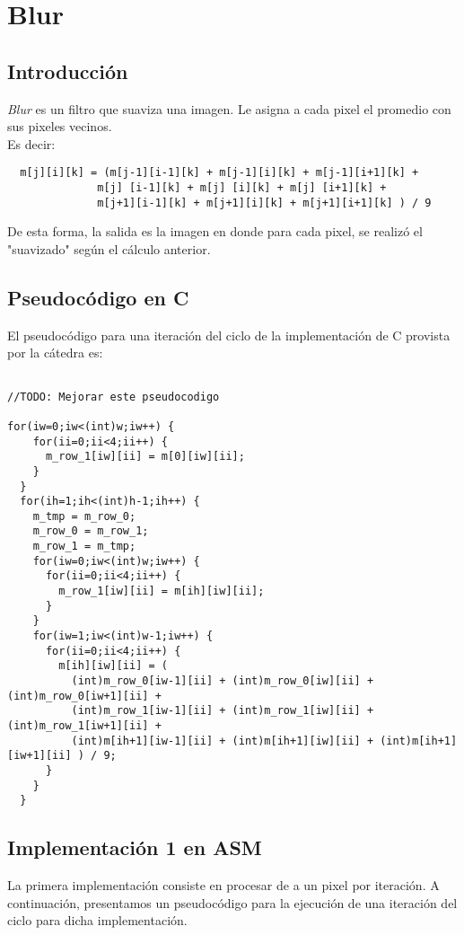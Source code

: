 \section{Blur}
\subsection{Introducción}
\textit{Blur} es un filtro que suaviza una imagen. Le asigna a cada pixel el promedio con sus pixeles vecinos.\\ Es decir:

\begin{verbatim}
  m[j][i][k] = (m[j-1][i-1][k] + m[j-1][i][k] + m[j-1][i+1][k] + 
              m[j] [i-1][k] + m[j] [i][k] + m[j] [i+1][k] + 
              m[j+1][i-1][k] + m[j+1][i][k] + m[j+1][i+1][k] ) / 9
\end{verbatim}

De esta forma, la salida es la imagen en donde para cada pixel, se realizó el "suavizado" según el cálculo anterior.

\subsection{Pseudocódigo en C}

El pseudocódigo para una iteración del ciclo de la implementación de C provista por la cátedra es:

\begin{lstlisting}

//TODO: Mejorar este pseudocodigo

for(iw=0;iw<(int)w;iw++) {
    for(ii=0;ii<4;ii++) {
      m_row_1[iw][ii] = m[0][iw][ii];
    }
  }
  for(ih=1;ih<(int)h-1;ih++) {
    m_tmp = m_row_0;
    m_row_0 = m_row_1;
    m_row_1 = m_tmp;
    for(iw=0;iw<(int)w;iw++) {
      for(ii=0;ii<4;ii++) {
        m_row_1[iw][ii] = m[ih][iw][ii];
      }
    }
    for(iw=1;iw<(int)w-1;iw++) {
      for(ii=0;ii<4;ii++) {
        m[ih][iw][ii] = ( 
          (int)m_row_0[iw-1][ii] + (int)m_row_0[iw][ii] + (int)m_row_0[iw+1][ii] +
          (int)m_row_1[iw-1][ii] + (int)m_row_1[iw][ii] + (int)m_row_1[iw+1][ii] +
          (int)m[ih+1][iw-1][ii] + (int)m[ih+1][iw][ii] + (int)m[ih+1][iw+1][ii] ) / 9;
      }
    }
  }

\end{lstlisting}

\subsection{Implementación 1 en ASM}
La primera implementación consiste en procesar de a un pixel por iteración.
A continuación, presentamos un pseudocódigo para la ejecución de una iteración del ciclo para dicha implementación.

